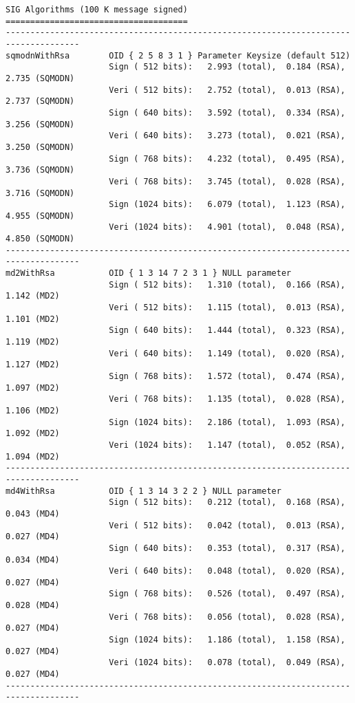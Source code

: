 {\begin{verbatim}
SIG Algorithms (100 K message signed)
=====================================
-------------------------------------------------------------------------------------
sqmodnWithRsa        OID { 2 5 8 3 1 } Parameter Keysize (default 512)
                     Sign ( 512 bits):   2.993 (total),  0.184 (RSA),  2.735 (SQMODN)  
                     Veri ( 512 bits):   2.752 (total),  0.013 (RSA),  2.737 (SQMODN)  
                     Sign ( 640 bits):   3.592 (total),  0.334 (RSA),  3.256 (SQMODN)  
                     Veri ( 640 bits):   3.273 (total),  0.021 (RSA),  3.250 (SQMODN)  
                     Sign ( 768 bits):   4.232 (total),  0.495 (RSA),  3.736 (SQMODN)  
                     Veri ( 768 bits):   3.745 (total),  0.028 (RSA),  3.716 (SQMODN)  
                     Sign (1024 bits):   6.079 (total),  1.123 (RSA),  4.955 (SQMODN)  
                     Veri (1024 bits):   4.901 (total),  0.048 (RSA),  4.850 (SQMODN)  
-------------------------------------------------------------------------------------
md2WithRsa           OID { 1 3 14 7 2 3 1 } NULL parameter
                     Sign ( 512 bits):   1.310 (total),  0.166 (RSA),  1.142 (MD2)  
                     Veri ( 512 bits):   1.115 (total),  0.013 (RSA),  1.101 (MD2)  
                     Sign ( 640 bits):   1.444 (total),  0.323 (RSA),  1.119 (MD2)  
                     Veri ( 640 bits):   1.149 (total),  0.020 (RSA),  1.127 (MD2)  
                     Sign ( 768 bits):   1.572 (total),  0.474 (RSA),  1.097 (MD2)  
                     Veri ( 768 bits):   1.135 (total),  0.028 (RSA),  1.106 (MD2)  
                     Sign (1024 bits):   2.186 (total),  1.093 (RSA),  1.092 (MD2)  
                     Veri (1024 bits):   1.147 (total),  0.052 (RSA),  1.094 (MD2)  
-------------------------------------------------------------------------------------
md4WithRsa           OID { 1 3 14 3 2 2 } NULL parameter
                     Sign ( 512 bits):   0.212 (total),  0.168 (RSA),  0.043 (MD4)  
                     Veri ( 512 bits):   0.042 (total),  0.013 (RSA),  0.027 (MD4)  
                     Sign ( 640 bits):   0.353 (total),  0.317 (RSA),  0.034 (MD4)  
                     Veri ( 640 bits):   0.048 (total),  0.020 (RSA),  0.027 (MD4)  
                     Sign ( 768 bits):   0.526 (total),  0.497 (RSA),  0.028 (MD4)  
                     Veri ( 768 bits):   0.056 (total),  0.028 (RSA),  0.027 (MD4)  
                     Sign (1024 bits):   1.186 (total),  1.158 (RSA),  0.027 (MD4)  
                     Veri (1024 bits):   0.078 (total),  0.049 (RSA),  0.027 (MD4)  
-------------------------------------------------------------------------------------

\end{verbatim}}
